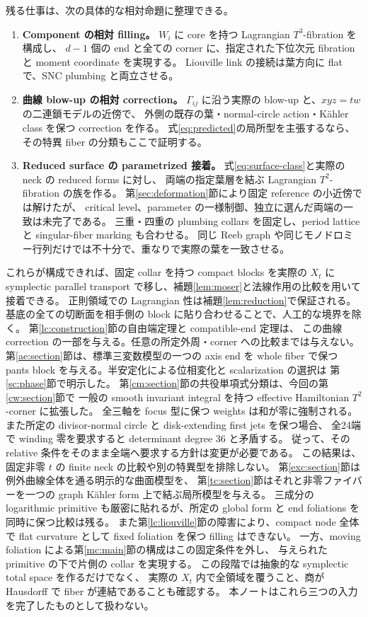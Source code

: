 \documentclass[11pt,a4paper]{article}
\theoremstyle{definition}
\begin{document}
残る仕事は、次の具体的な相対命題に整理できる。
\begin{enumerate}
\item \textbf{Component の相対 filling。}
$W_i$ に core を持つ Lagrangian $T^3$-fibration を構成し、
$d-1$ 個の end と全ての corner に、指定された下位次元 fibration と moment coordinate を実現する。
Liouville link の接続は葉方向に flat で、SNC plumbing と両立させる。
\item \textbf{曲線 blow-up の相対 correction。}
$\Gamma_{ij}$ に沿う実際の blow-up と、$xyz=tw$ の二連鎖モデルの近傍で、
外側の既存の葉・normal-circle action・Kähler class を保つ correction を作る。
式\eqref{eq:predicted}の局所型を主張するなら、その特異 fiber の分類もここで証明する。
\item \textbf{Reduced surface の parametrized 接着。}
式\eqref{eq:surface-class}と実際の neck の reduced forms に対し、
両端の指定葉層を結ぶ Lagrangian $T^2$-fibration の族を作る。
第\ref{sec:deformation}節により固定 reference の小近傍では解けたが、
critical level、parameter の一様制御、独立に選んだ両端の一致は未完了である。
三重・四重の plumbing collars を固定し、period lattice と singular-fiber marking も合わせる。
同じ Reeb graph や同じモノドロミー行列だけでは不十分で、重なりで実際の葉を一致させる。
\end{enumerate}
これらが構成できれば、固定 collar を持つ compact blocks を実際の $X_t$ に
symplectic parallel transport で移し、補題\ref{lem:moser}と法線作用の比較を用いて接着できる。
正則領域での Lagrangian 性は補題\ref{lem:reduction}で保証される。
基底の全ての切断面を相手側の block に貼り合わせることで、人工的な境界を除く。
第\ref{lc:construction}節の自由端定理と compatible-end 定理は、
この曲線 correction の一部を与える。任意の所定外周・corner への比較までは与えない。
第\ref{ae:section}節は、標準三変数模型の一つの axis end を whole fiber で保つ
pants block を与える。半安定化による位相変化と scalarization の選択は
第\ref{sc:phase}節で明示した。
第\ref{cm:section}節の共役単項式分類は、今回の第\ref{cw:section}節で
一般の smooth invariant integral を持つ effective Hamiltonian $T^2$-corner に拡張した。
全三軸を focus 型に保つ weights は和が零に強制される。
また所定の divisor-normal circle と disk-extending first jets を保つ場合、
全24端で winding 零を要求すると determinant degree 36 と矛盾する。
従って、その relative 条件をそのまま全端へ要求する方針は変更が必要である。
この結果は、固定非零 $t$ の finite neck の比較や別の特異型を排除しない。
第\ref{exc:section}節は例外曲線全体を通る明示的な曲面模型を、
第\ref{tc:section}節はそれと非零ファイバーを一つの graph Kähler form 上で結ぶ局所模型を与える。
三成分の logarithmic primitive も厳密に貼れるが、所定の global form と end foliations を
同時に保つ比較は残る。
また第\ref{lc:liouville}節の障害により、compact node 全体で flat curvature として
fixed foliation を保つ filling はできない。
一方、moving foliation による第\ref{mc:main}節の構成はこの固定条件を外し、
与えられた primitive の下で片側の collar を実現する。
この段階では抽象的な symplectic total space を作るだけでなく、
実際の $X_t$ 内で全領域を覆うこと、商が Hausdorff で fiber が連結であることも確認する。
本ノートはこれら三つの入力を完了したものとして扱わない。
\end{document}
